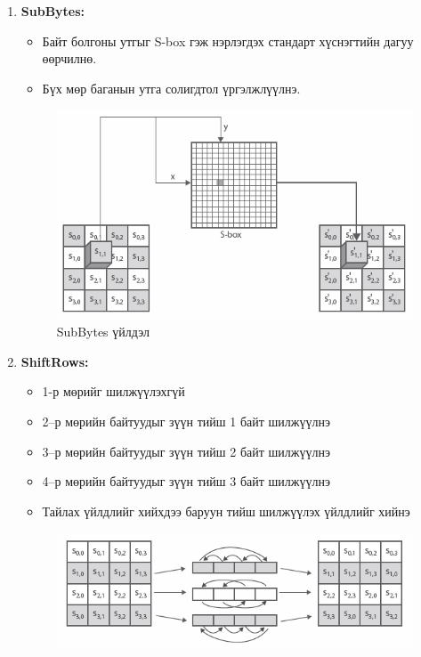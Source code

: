 	\begin{enumerate}
		\item \textbf{SubBytes:}
		      \begin{itemize}
			      \item Байт болгоны утгыг S-box гэж нэрлэгдэх стандарт хүснэгтийн дагуу өөрчилнө.
			      \item Бүх мөр баганын утга солигдтол үргэлжлүүлнэ.
		      \end{itemize}
		      \begin{figure}[h]
			      \centering
			      \includegraphics[scale=0.65]{assets/subbytes.png}
			      \caption{SubBytes үйлдэл}
			      \label{fig:subbytes}
		      \end{figure}
		\item \textbf{ShiftRows:}
		      \begin{itemize}
			      \item 1-р мөрийг шилжүүлэхгүй
			      \item 2–р мөрийн байтуудыг зүүн тийш 1 байт шилжүүлнэ
			      \item 3–р мөрийн байтуудыг зүүн тийш 2 байт шилжүүлнэ
			      \item 4–р мөрийн байтуудыг зүүн тийш 3 байт шилжүүлнэ
			      \item Тайлах үйлдлийг хийхдээ баруун тийш шилжүүлэх үйлдлийг хийнэ
		      \end{itemize}
		      \begin{figure}[h]
			      \centering
			      \includegraphics[scale=0.6]{assets/shiftrows.png}

\end{figure}
\end{enumerate}
